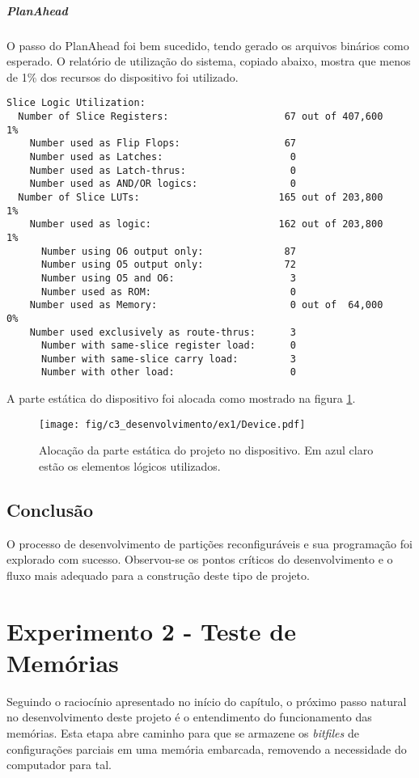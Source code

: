 \documentclass[11pt,a4paper,oneside]{book}
\begin{document}
\paragraph{PlanAhead}
O passo do PlanAhead foi bem sucedido, tendo gerado os arquivos binários como esperado.
O relatório de utilização do sistema, copiado abaixo, mostra que menos de 1\% dos recursos do dispositivo foi utilizado.
\begin{lstlisting}
Slice Logic Utilization:
  Number of Slice Registers:                    67 out of 407,600    1%
    Number used as Flip Flops:                  67
    Number used as Latches:                      0
    Number used as Latch-thrus:                  0
    Number used as AND/OR logics:                0
  Number of Slice LUTs:                        165 out of 203,800    1%
    Number used as logic:                      162 out of 203,800    1%
      Number using O6 output only:              87
      Number using O5 output only:              72
      Number using O5 and O6:                    3
      Number used as ROM:                        0
    Number used as Memory:                       0 out of  64,000    0%
    Number used exclusively as route-thrus:      3
      Number with same-slice register load:      0
      Number with same-slice carry load:         3
      Number with other load:                    0
\end{lstlisting}
A parte estática do dispositivo foi alocada como mostrado na figura \ref{fig:ex1:device}.

\begin{figure}[h]
\centering
\texttt{[image: fig/c3\_desenvolvimento/ex1/Device.pdf]}
\caption{Alocação da parte estática do projeto no dispositivo. Em azul claro estão os elementos lógicos utilizados.}
\label{fig:ex1:device}
\end{figure}

\section{Conclusão}
O processo de desenvolvimento de partições reconfiguráveis e sua programação foi explorado com sucesso.
Observou-se os pontos críticos do desenvolvimento e o fluxo mais adequado para a construção deste tipo de projeto.

\chapter{Experimento 2 - Teste de Memórias}
Seguindo o raciocínio apresentado no início do capítulo, o próximo passo natural no desenvolvimento deste projeto é o entendimento do funcionamento das memórias.
Esta etapa abre caminho para que se armazene os \textit{bitfiles} de configurações parciais em uma memória embarcada, removendo a necessidade do computador para tal.
\end{document}
